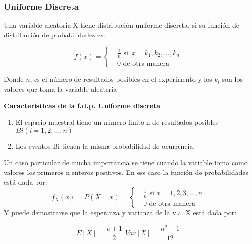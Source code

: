 \subsubsection{Uniforme Discreta}

Una variable aleatoria X tiene distribución uniforme discreta, si su función de distribución de probabilidades es:

\begin{equation}
    f(x)=\begin{cases}
         & \frac{1}{n}\text{ si }\, x=k_1, k_2,\dots ,k_n \\
         & 0\text{ de otra manera}\end{cases}
\end{equation}

Donde $n$, es el número de resultados posibles en el experimento y los $k_i$ son los valores que toma la variable aleatoria

\textbf{Características de la f.d.p. Uniforme discreta}

\begin{enumerate}
    \item El espacio muestral tiene un número finito n de resultados posibles $Bi (i=1,2,\dots ,n)$
    \item Los eventos Bi tienen la misma probabilidad de ocurrencia.
\end{enumerate}

Un caso particular de mucha importancia se tiene cuando la variable toma como valores los primeros n enteros positivos. En ese caso la función de probabilidades está dada por:
\begin{equation}
    f_X(x)=P(X=x)=\begin{cases}
         & \frac{1}{n}\text{ si }x=1,2,3,\dots,n \\
         & 0\text{ de otra manera}\end{cases}
\end{equation}
Y puede demostrarse que la esperanza y varianza de la v.a. X está dada
por:

\begin{equation}
    E\left[X\right]=\frac{n+1}{2}\,\,Var\left[X\right]=\frac{n^2-1}{12}
\end{equation}

